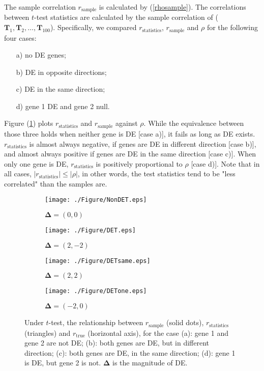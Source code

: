 \documentclass[12pt, a4paper]{article}
\begin{document}
	The sample correlation $r_{\text{sample}}$ is calculated by (\ref{rhosample}). The correlations
	between $t$-test statistics are calculated by the sample correlation of ($\bm T_1, \bm T_2, \ldots,
	\bm T_{100}$). Specifically, we compared $r_\text{statistics}$, $r_{\text{sample}}$ and $\rho$ for
	the following four cases:
	\begin{enumerate}
		\item[a)] no DE genes;
		\item[b)]  DE in opposite directions;
		\item[c)] DE in the same direction; 
		\item[d)] gene 1 DE and gene 2 null.
	\end{enumerate}
	Figure (\ref{figureT}) plots $r_\text{statistics}$ and $r_{\text{sample}}$ against $\rho$. While the
	equivalence between those three holds when neither gene is DE [case a)], it fails as long as DE
	exists. $r_\text{statistics}$ is almost always negative, if genes are DE in different direction
	[case b)], and almost always positive if genes are DE in the same direction [case c)]. When only one
	gene is DE,  $r_\text{statistics}$ is positively proportional to $\rho$ [case d)]. Note that in all
	cases, $|r_{\text{statistics}}| \leq |\rho|$, in other words, the test statistics tend to be "less
	correlated" than the samples are.
	
	\begin{figure}[!ht]
		\centering
		\begin{subfigure}{.5\textwidth}
			\centering
			\texttt{[image: ./Figure/NonDET.eps]}
			\captionsetup{justification=centering}
			\caption{$\bm \Delta= (0, 0)$}
		\end{subfigure}%
		\begin{subfigure}{.5\textwidth}
			\centering
			\texttt{[image: ./Figure/DET.eps]}
			\captionsetup{justification=centering}
			\caption{$\bm \Delta= (2, -2)$}
		\end{subfigure}
		\newline
		\newline
		\centering
		\begin{subfigure}{.5\textwidth}
			\centering
			\texttt{[image: ./Figure/DETsame.eps]}
			\captionsetup{justification=centering}
			\caption{$\bm \Delta= (2, 2)$}
		\end{subfigure}%
		\begin{subfigure}{.5\textwidth}
			\centering
			\texttt{[image: ./Figure/DETone.eps]}
			\captionsetup{justification=centering}
			\caption{$\bm \Delta= (-2, 0)$ }
		\end{subfigure}
		\caption{Under $t$-test, the relationship between $r_{\text{sample}}$ (solid dots), $
			r_\text{statistics}$ (triangles) and $r_{\text{true}}$ (horizontal axis), for the case (a): gene 1
			and gene 2 are not DE; (b): both genes are DE, but in different direction; (c): both genes are DE,
			in the same direction; (d): gene 1 is DE, but gene 2 is not. $\bm \Delta$ is the magnitude of DE.}
		\label{figureT}
	\end{figure}
	
\end{document}
